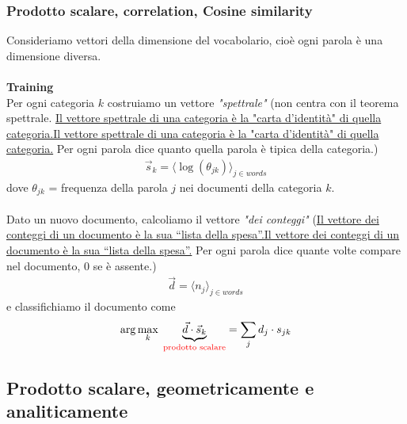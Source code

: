 \documentclass[a4paper,12pt]{article}
\let\mathunderline\underline
\renewcommand{\underline}[1]{\ifmmode\mathunderline{#1}\else\uline{#1}\fi}   %
\begin{document}
\subsubsection{Prodotto scalare, correlation, Cosine similarity}
Consideriamo vettori della dimensione del vocabolario, cioè ogni parola è una dimensione diversa.\\
\vspace{1px}\\
\textbf{Training}\\
Per ogni categoria $k$ costruiamo un vettore \textit{"spettrale"} (non centra con il teorema spettrale. \underline{Il vettore spettrale di una categoria è la "carta d'identità" di quella categoria.} Per ogni parola dice quanto quella parola è tipica della categoria.)
\begin{align*}
    \vec{s}_k = \langle \log(\theta_{jk})\rangle_{j\in words}
\end{align*}
dove $\theta_{jk}$ = frequenza della parola $j$ nei documenti della categoria $k$.\\
\vspace{1px}\\
Dato un nuovo documento, calcoliamo il vettore \textit{"dei conteggi"} (\underline{Il vettore dei conteggi di un documento è la sua ``lista della spesa''.} Per ogni parola dice quante volte compare nel documento, $0$ se è assente.)
\begin{align*}
    \vec{d} = \langle n_j\rangle_{j\in words}
\end{align*}
e classifichiamo il documento come
\begin{align*}
    \arg\max_k \; \underbrace{\vec{d}\cdot \vec{s}_k}_{\textcolor{red}{\text{prodotto scalare}}} = \sum_j d_j\cdot s_{jk}
\end{align*}
\subsection*{Prodotto scalare, geometricamente e analiticamente}
\end{document}
